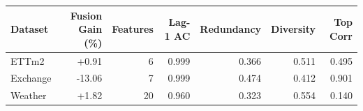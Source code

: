 \begin{tabular}{lrrrrrr}
\toprule
Dataset & Fusion Gain (\%) & Features & Lag-1 AC & Redundancy & Diversity & Top Corr \\
\midrule
ETTm2 & +0.91 & 6 & 0.999 & 0.366 & 0.511 & 0.495 \\
Exchange & -13.06 & 7 & 0.999 & 0.474 & 0.412 & 0.901 \\
Weather & +1.82 & 20 & 0.960 & 0.323 & 0.554 & 0.140 \\
\bottomrule
\end{tabular}

